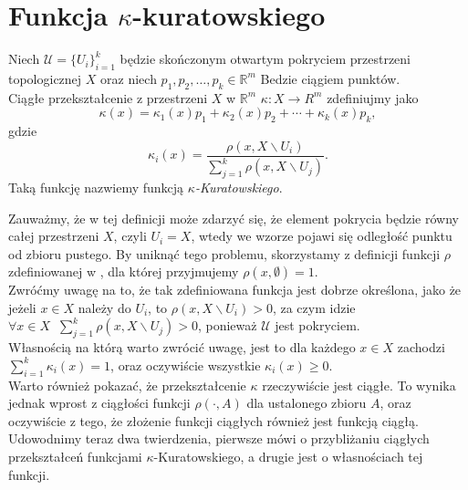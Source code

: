 \section{Funkcja $\kappa$-kuratowskiego}
\begin{defi}
    Niech $\mathcal{U} = \{U_i \} _{i=1}^k$ będzie skończonym otwartym pokryciem przestrzeni topologicznej $X$ oraz niech $p_1, p_2, \ldots, p_k \in \mathbb{R}^m$ Bedzie ciągiem punktów.\\
    Ciągłe przekształcenie z przestrzeni $X$ w $\mathbb{R}^m$ $\kappa :X\rightarrow R^m$ zdefiniujmy jako
    \[\kappa(x) = \kappa_1(x)p_1+\kappa_2(x)p_2+\cdots+\kappa_k(x)p_k ,\]
    gdzie 
    \[\kappa_i(x) = \frac{\rho(x, X\backslash U_i)}{\sum _{j=1}^k\rho(x, X\backslash U_j)}.\]
    Taką funkcję nazwiemy funkcją \emph{$\kappa$-Kuratowskiego}.
    \cite{kuratowski1933}
\end{defi}
Zauważmy, że w tej definicji może zdarzyć się, że element pokrycia będzie równy całej przestrzeni $X$, czyli $U_i=X$, wtedy we wzorze pojawi się odległość punktu od zbioru pustego. By uniknąć tego problemu, skorzystamy z definicji funkcji $\rho$ zdefiniowanej w \cite{engelking1989}, dla której przyjmujemy $\rho(x, \emptyset)=1$.\\
Zwróćmy uwagę na to, że tak zdefiniowana funkcja jest dobrze określona, jako że jeżeli $x\in X$ należy do $U_i$, to $\rho(x, X\backslash U_i)>0$, za czym idzie 
$\forall x\in X\;\;\sum _{j=1}^k\rho(x, X\backslash U_j)>0$, ponieważ $\mathcal{U}$ jest pokryciem.\\ 
Własnością na którą warto zwrócić uwagę, jest to dla każdego $x\in X$ zachodzi $\sum_{i=1}^{k}\kappa_i(x)=1$, oraz oczywiście wszystkie $\kappa_i(x)\ge 0$.\\
Warto również pokazać, że przekształcenie $\kappa$ rzeczywiście jest ciągłe. To wynika jednak wprost z ciągłości funkcji $\rho(\cdot, A)$ dla ustalonego zbioru $A$, oraz oczywiście z tego, że złożenie funkcji ciągłych również jest funkcją ciągłą.\\

Udowodnimy teraz dwa twierdzenia, pierwsze mówi o przybliżaniu ciągłych przekształceń funkcjami $\kappa$-Kuratowskiego, a drugie jest o własnościach tej funkcji.

